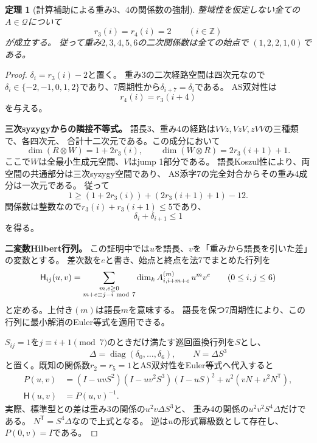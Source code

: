 \documentclass[11pt,a4paper]{ltjsarticle}
\newtheorem{theorem}{定理}[section]
\theoremstyle{definition}
\begin{document}
\begin{theorem}[計算補助による重み3、4の関係数の強制]
\label{idx:thm:mixed-relation-ranks}
整域性を仮定しない全ての$A\in\mathcal Q$について
\[
r_3(i)=r_4(i)=2\qquad(i\in\mathbb Z)
\]
が成立する。
従って重み$2,3,4,5,6$の二次関係数は全ての始点で
$(1,2,2,1,0)$である。
\end{theorem}
\begin{proof}
$\delta_i=r_3(i)-2$と置く。
重み3の二次経路空間は四次元なので
$\delta_i\in\{-2,-1,0,1,2\}$であり、7周期性から$\delta_{i+7}=\delta_i$である。
AS双対性は
\[
r_4(i)=r_3(i+4)
\]
を与える。

\par\smallskip\noindent\textbf{三次syzygyからの隣接不等式。}\quad
語長3、重み4の経路は$VVz,VzV,zVV$の三種類で、各四次元、
合計十二次元である。この成分において
\[
\dim(R\otimes W)=1+2r_3(i),\qquad
\dim(W\otimes R)=2r_3(i+1)+1.
\]
ここで$W$は全最小生成元空間、$V$はjump 1部分である。
語長Koszul性により、両空間の共通部分は三次syzygy空間であり、
AS添字7の完全対合からその重み4成分は一次元である。
従って
\[
1\geq (1+2r_3(i))+(2r_3(i+1)+1)-12.
\]
関係数は整数なので$r_3(i)+r_3(i+1)\leq5$であり、
\begin{equation}\label{idx:eq:mixed-adjacent-bound}
\delta_i+\delta_{i+1}\leq1
\end{equation}
を得る。

\par\smallskip\noindent\textbf{二変数Hilbert行列。}\quad
この証明中では$u$を語長、$v$を「重みから語長を引いた差」の変数とする。
差次数を$e$と書き、始点と終点を法7でまとめた行列を
\[
\mathsf H_{ij}(u,v)=
\sum_{\substack{m,e\geq0\\m+e\equiv j-i\ {\rm mod}\ 7}}
\dim_k A_{i,i+m+e}^{(m)}\,u^m v^e
\qquad(0\leq i,j\leq6)
\]
と定める。上付き$(m)$は語長$m$を意味する。
語長を保つ7周期性により、この行列に最小解消のEuler等式を適用できる。

$S_{ij}=1$を$j\equiv i+1\pmod7$のときだけ満たす巡回置換行列を$S$とし、
\[
\Delta=\operatorname{diag}(\delta_0,\ldots,\delta_6),\qquad
N=\Delta S^3
\]
と置く。既知の関係数$r_2=r_5=1$とAS双対性をEuler等式へ代入すると
\begin{equation}\label{idx:eq:mixed-Hilbert-inverse}
\begin{split}
P(u,v)
&=(I-uvS^2)(I-uv^2S^3)(I-uS)^2
   +u^2(vN+v^2N^{\mathsf T}),\\
\mathsf H(u,v)&=P(u,v)^{-1}.
\end{split}
\end{equation}
実際、標準型との差は重み3の関係の$u^2v\Delta S^3$と、
重み4の関係の$u^2v^2S^4\Delta$だけである。
$N^{\mathsf T}=S^4\Delta$なので上式となる。
逆は$u$の形式冪級数として存在し、$P(0,v)=I$である。


\end{proof}
\end{document}
